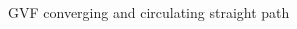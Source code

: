 \documentclass[conf]{new-aiaa}
\begin{document}
\begin{figure}[H]
	\begin{subfigmatrix}{2}%
		\centering	
		\hspace*{0mm}
	\end{subfigmatrix}
	\caption{GVF converging and circulating straight path}
	\label{fig:GVFLine}
\end{figure}
\end{document}
